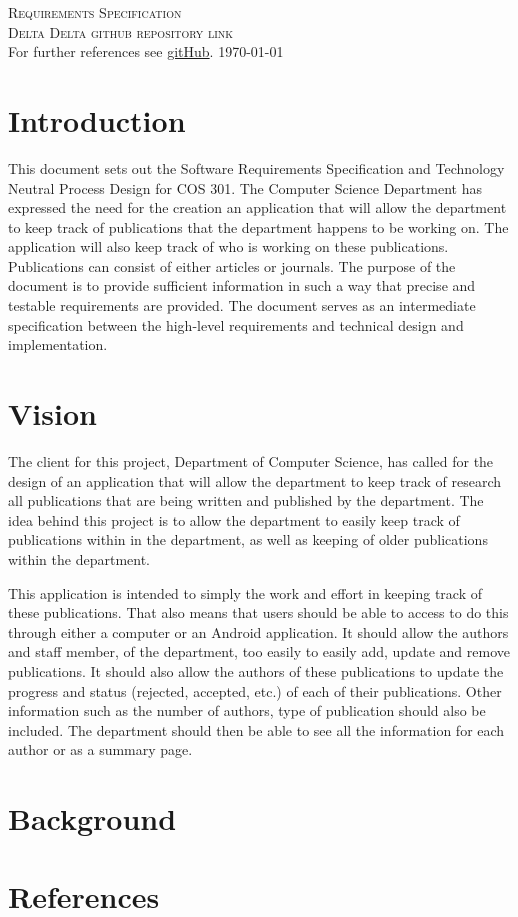 \documentclass[a4paper,12pt]{report}
\begin{document}
\renewcommand{\thesection}{\arabic{section}}
\newpage
\begin{center}
\textsc{\LARGE Requirements Specification}\\[1.5cm]
\textsc{\Large Delta Delta github repository link}\\[0.5cm]
For further references see \href{https://github.com/u12081095/COS301-Team-Delta}{gitHub}.
\today
\end{center}


\newpage
\section{Introduction}

This document sets out the Software Requirements Specification and Technology Neutral Process Design for COS 301. The Computer Science Department has expressed the need for the creation an application that will allow the department to keep track of publications that the department happens to be working on. The application will also keep track of who is working on these publications. Publications can consist of either articles or journals. The purpose of the document is to provide sufficient information in such a way that precise and testable requirements are provided. The document serves as an intermediate specification between the high-level requirements and technical design and implementation. 

\newpage
\section{Vision}

The client for this project, Department of Computer Science, has called for the design of an application that will allow the department to keep track of research all publications that are being written and published by the department.  The idea behind this project is to allow the department to easily keep track of publications within in the department, as well as keeping of older publications within the department.

This application is intended to simply the work and effort in keeping track of these publications. That also means that users should be able to access to do this through either a computer or an Android application. It should allow the authors and staff member, of the department, too easily to easily add, update and remove publications. It should also allow the authors of these publications to update the progress and status (rejected, accepted, etc.) of each of their publications. Other information such as the number of authors, type of publication should also be included. The department should then be able to see all the information for each author or as a summary page.

\newpage
\section{Background}


\newpage
\section{References}
\end{document}
